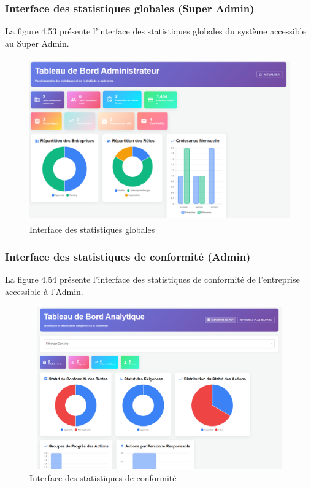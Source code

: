 \subsubsection{Interface des statistiques globales (Super Admin)}
\noindent La figure 4.53 présente l'interface des statistiques globales du système accessible au Super Admin.

\begin{figure}[H]
    \centering
    \includegraphics[width=12cm,height=7cm]{images/globalstatsinterface.PNG}
    \caption{Interface des statistiques globales}
\end{figure}

\subsubsection{Interface des statistiques de conformité (Admin)}
\noindent La figure 4.54 présente l'interface des statistiques de conformité de l'entreprise accessible à l'Admin.

\begin{figure}[H]
    \centering
    \includegraphics[width=12cm,height=7cm]{images/compliancestatsinterface.PNG}
    \caption{Interface des statistiques de conformité}
\end{figure}

